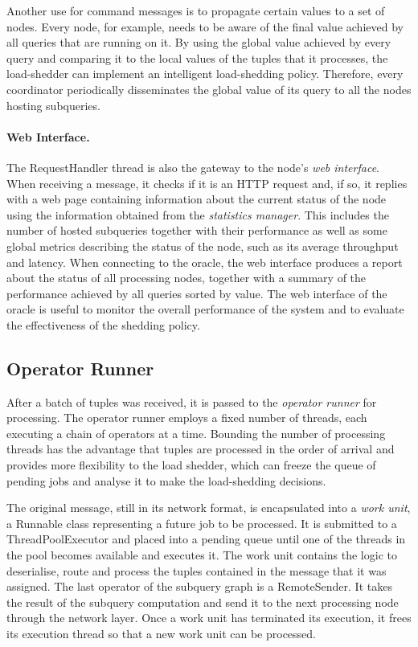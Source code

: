 Another use for command messages is to propagate certain values to a set of nodes. Every node, for
example, needs to be aware of the final \sic value achieved by all queries that are running on it.
By using the global \sic value achieved by every query and comparing it to the local values of the tuples
that it processes, the load-shedder can implement an intelligent load-shedding policy. Therefore, every
coordinator periodically disseminates the global \sic value of its query to all the nodes hosting subqueries.
\vspace{-10pt}
\paragraph{Web Interface.}
The RequestHandler thread is also the gateway to the node's \emph{web interface}. When receiving a
message, it checks if it is an HTTP request and, if so, it replies with a web page containing information
about the current status of the node using the information obtained from the \emph{statistics manager}.
This includes the number of hosted subqueries together with their performance as well as some global
metrics describing the status of the node, such as its average throughput and latency.
When connecting to the oracle, the web interface produces a report about the status of all processing
nodes, together with a summary of the performance achieved by all queries sorted by \sic value. The web
interface of the oracle is useful to monitor the overall performance of the system and to evaluate the
effectiveness of the shedding policy. 

\subsection*{Operator Runner}
After a batch of tuples was received, it is passed to the \emph{operator runner} for processing.
The operator runner employs a fixed number of threads, each
executing a chain of operators at a time. Bounding the number of processing threads has the
advantage that tuples are processed in the order of arrival and provides more flexibility to the load
shedder, which can freeze the queue of pending jobs and analyse it to make the load-shedding decisions.

The original message, still in its network format, is encapsulated into a \emph{work unit}, a Runnable
class representing a future job to be processed. It is submitted to a ThreadPoolExecutor and placed into
a pending queue until one of the threads in the pool becomes available and executes it. The work unit
contains the logic to deserialise, route and process the tuples contained in the message that it was
assigned. The last operator of the subquery graph is a RemoteSender. It takes the result of
the subquery computation and send it to the next processing node through the network layer. Once a work
unit has terminated its execution, it frees its execution thread so that a new work unit
can be processed.
\vspace{-10pt}
